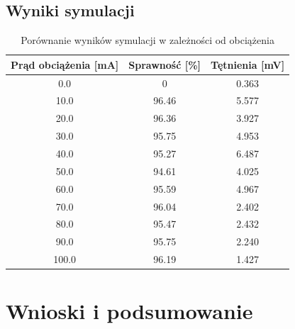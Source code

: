 \documentclass{article}
\begin{document}
\subsection{Wyniki symulacji}
\begin{table}[H]
    \centering
    \caption{Porównanie wyników symulacji w zależności od obciążenia}
    \label{tab:efficiency_ripple}
    \begin{tabular}{ccc}
        \toprule
        \textbf{Prąd obciążenia [mA]} & \textbf{Sprawność [\%]} & \textbf{Tętnienia [mV]} \\
        \midrule
        0.0                           & 0                       & 0.363                   \\
        10.0                          & 96.46                   & 5.577                   \\
        20.0                          & 96.36                   & 3.927                   \\
        30.0                          & 95.75                   & 4.953                   \\
        40.0                          & 95.27                   & 6.487                   \\
        50.0                          & 94.61                   & 4.025                   \\
        60.0                          & 95.59                   & 4.967                   \\
        70.0                          & 96.04                   & 2.402                   \\
        80.0                          & 95.47                   & 2.432                   \\
        90.0                          & 95.75                   & 2.240                   \\
        100.0                         & 96.19                   & 1.427                   \\
        \bottomrule
    \end{tabular}
\end{table}

\newpage
\section{Wnioski i podsumowanie}
\end{document}
